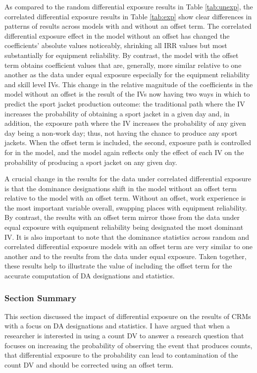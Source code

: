 \documentclass[ShortAfour,times,sageapa]{sagej}
\begin{document}
	As compared to the random differential exposure results in Table \ref{tab:unexp}, the correlated differential exposure results in Table \ref{tab:exp} show clear differences in patterns of results across models with and without an offset term.
	The correlated differential exposure effect in the model without an offset has changed the coefficients' absolute values noticeably, shrinking all IRR values but most substantially for equipment reliability.
	By contrast, the model with the offset term obtains coefficient values that are, generally, more similar relative to one another as the data under equal exposure especially for the equipment reliability and skill level IVs.
	This change in the relative magnitude of the coefficients in the model without an offset is the result of the IVs now having two ways in which to predict the sport jacket production outcome: the traditional path where the IV increases the probability of obtaining a sport jacket in a given day and, in addition, the exposure path where the IV increases the probability of any given day being a non-work day; thus, not having the chance to produce any sport jackets.
	When the offset term is included, the second, exposure path is controlled for in the model, and the model again reflects only the effect of each IV on the probability of producing a sport jacket on any given day.
	
	A crucial change in the results for the data under correlated differential exposure is that the dominance designations shift in the model without an offset term relative to the model with an offset term.
	Without an offset, work experience is the most important variable overall, swapping places with equipment reliability. 
	By contrast, the results with an offset term mirror those from the data under equal exposure with equipment reliability being designated the most dominant IV.
	It is also important to note that the dominance statistics across random and correlated differential exposure models with an offset term are very similar to one another and to the results from the data under equal exposure.
	Taken together, these results help to illustrate the value of including the offset term for the accurate computation of DA designations and statistics.	
	
		\subsubsection{Section Summary}
		
	This section discussed the impact of differential exposure on the results of CRMs with a focus on DA designations and statistics.
	I have argued that when a researcher is interested in using a count DV to answer a research question that focuses on increasing the probability of observing the event that produces counts, that differential exposure to the probability can lead to contamination of the count DV and should be corrected using an offset term.
	
\end{document}
